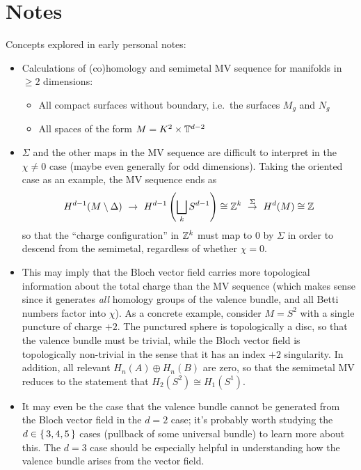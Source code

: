 {\color{red}
\section*{Notes}
Concepts explored in early personal notes:
\begin{itemize}
	\item Calculations of (co)homology and semimetal MV sequence for manifolds in $\geq2$ dimensions:
	\begin{itemize}
		\item All compact surfaces without boundary, i.e.\ the surfaces $M_g$ and $N_g$
		
		\item All spaces of the form $M = K^2 \times \mathbb{T}^{d-2}$
	\end{itemize}
	
	\item $\Sigma$ and the other maps in the MV sequence are difficult to interpret in the $\chi\neq 0$ case (maybe even generally for odd dimensions). Taking the oriented case as an example, the MV sequence ends as
	\begin{align*}
		H^{d-1}(M\setminus\Delta)\ \rightarrow\ H^{d-1}\left(\bigsqcup_{k}S^{d-1}\right) \cong \Z^k\ \overset{\Sigma}{\rightarrow}\ H^d(M) \cong \Z
	\end{align*}
	so that the ``charge configuration'' in $\mathbb{Z}^k$ must map to 0 by $\Sigma$ in order to descend from the semimetal, regardless of whether $\chi=0$.
	
	\item This may imply that the Bloch vector field carries more topological information about the total charge than the MV sequence (which makes sense since it generates \emph{all} homology groups of the valence bundle, and all Betti numbers factor into $\chi$). As a concrete example, consider $M=S^2$ with a single puncture of charge $+2$. The punctured sphere is topologically a disc, so that the valence bundle must be trivial, while the Bloch vector field is topologically non-trivial in the sense that it has an index $+2$ singularity. In addition, all relevant $H_n(A)\oplus H_n(B)$ are zero, so that the semimetal MV reduces to the statement that $H_2(S^2)\cong H_1(S^1)$.
	
	\item It may even be the case that the valence bundle cannot be generated from the Bloch vector field in the $d=2$ case; it's probably worth studying the $d\in\set{3,4,5}$ cases (pullback of some universal bundle) to learn more about this. The $d=3$ case should be especially helpful in understanding how the valence bundle arises from the vector field.
	

\end{itemize}}
